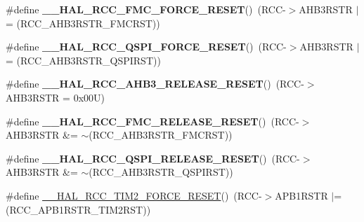 \begin{DoxyCompactItemize}
\#define {\bfseries \+\_\+\+\_\+\+H\+A\+L\+\_\+\+R\+C\+C\+\_\+\+F\+M\+C\+\_\+\+F\+O\+R\+C\+E\+\_\+\+R\+E\+S\+ET}()~(R\+CC-\/$>$A\+H\+B3\+R\+S\+TR $\vert$= (R\+C\+C\+\_\+\+A\+H\+B3\+R\+S\+T\+R\+\_\+\+F\+M\+C\+R\+ST))
\item 
\mbox{\label{group___r_c_c_ex___force___release___peripheral___reset_ga74a4afc21ca89d872351c19d2dee2f4d}} 
\#define {\bfseries \+\_\+\+\_\+\+H\+A\+L\+\_\+\+R\+C\+C\+\_\+\+Q\+S\+P\+I\+\_\+\+F\+O\+R\+C\+E\+\_\+\+R\+E\+S\+ET}()~(R\+CC-\/$>$A\+H\+B3\+R\+S\+TR $\vert$= (R\+C\+C\+\_\+\+A\+H\+B3\+R\+S\+T\+R\+\_\+\+Q\+S\+P\+I\+R\+ST))
\item 
\mbox{\label{group___r_c_c_ex___force___release___peripheral___reset_ga200c904f6644fc13da81eed085bc6850}} 
\#define {\bfseries \+\_\+\+\_\+\+H\+A\+L\+\_\+\+R\+C\+C\+\_\+\+A\+H\+B3\+\_\+\+R\+E\+L\+E\+A\+S\+E\+\_\+\+R\+E\+S\+ET}()~(R\+CC-\/$>$A\+H\+B3\+R\+S\+TR = 0x00\+U)
\item 
\mbox{\label{group___r_c_c_ex___force___release___peripheral___reset_ga191d8277915b05918cc1d9a79269f025}} 
\#define {\bfseries \+\_\+\+\_\+\+H\+A\+L\+\_\+\+R\+C\+C\+\_\+\+F\+M\+C\+\_\+\+R\+E\+L\+E\+A\+S\+E\+\_\+\+R\+E\+S\+ET}()~(R\+CC-\/$>$A\+H\+B3\+R\+S\+TR \&= $\sim$(R\+C\+C\+\_\+\+A\+H\+B3\+R\+S\+T\+R\+\_\+\+F\+M\+C\+R\+ST))
\item 
\mbox{\label{group___r_c_c_ex___force___release___peripheral___reset_gaba6a441e1c8f8ae009f51d7d9fa8233d}} 
\#define {\bfseries \+\_\+\+\_\+\+H\+A\+L\+\_\+\+R\+C\+C\+\_\+\+Q\+S\+P\+I\+\_\+\+R\+E\+L\+E\+A\+S\+E\+\_\+\+R\+E\+S\+ET}()~(R\+CC-\/$>$A\+H\+B3\+R\+S\+TR \&= $\sim$(R\+C\+C\+\_\+\+A\+H\+B3\+R\+S\+T\+R\+\_\+\+Q\+S\+P\+I\+R\+ST))
\item 
\mbox{\label{group___r_c_c_ex___force___release___peripheral___reset_ga1010b7c4a9122449860babb341f01d7b}} 
\#define \mbox{\hyperlink{group___r_c_c_ex___force___release___peripheral___reset_ga1010b7c4a9122449860babb341f01d7b}{\+\_\+\+\_\+\+H\+A\+L\+\_\+\+R\+C\+C\+\_\+\+T\+I\+M2\+\_\+\+F\+O\+R\+C\+E\+\_\+\+R\+E\+S\+ET}}()~(R\+CC-\/$>$A\+P\+B1\+R\+S\+TR $\vert$= (R\+C\+C\+\_\+\+A\+P\+B1\+R\+S\+T\+R\+\_\+\+T\+I\+M2\+R\+ST))

\end{DoxyCompactItemize}
